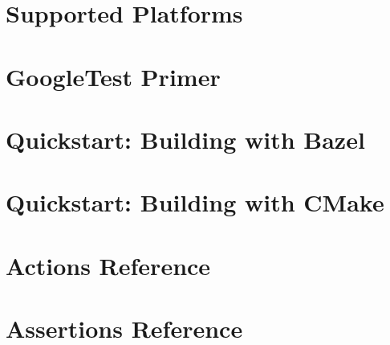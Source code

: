 \let\mypdfximage\pdfximage\def\pdfximage{\immediate\mypdfximage}\documentclass[twoside]{book}
\newcommand{\+}{\discretionary{\mbox{\scriptsize$\hookleftarrow$}}{}{}}
\begin{document}
\chapter{Supported Platforms}
\label{md__home_mary_VegaProgramEngineering_2024_build__deps_googletest-src_docs_platforms}

\chapter{Google\+Test Primer}
\label{md__home_mary_VegaProgramEngineering_2024_build__deps_googletest-src_docs_primer}

\chapter{Quickstart\+: Building with Bazel}
\label{md__home_mary_VegaProgramEngineering_2024_build__deps_googletest-src_docs_quickstart-bazel}

\chapter{Quickstart\+: Building with C\+Make}
\label{md__home_mary_VegaProgramEngineering_2024_build__deps_googletest-src_docs_quickstart-cmake}

\chapter{Actions Reference}
\label{md__home_mary_VegaProgramEngineering_2024_build__deps_googletest-src_docs_reference_actions}

\chapter{Assertions Reference}
\label{md__home_mary_VegaProgramEngineering_2024_build__deps_googletest-src_docs_reference_assertions}

\end{document}
